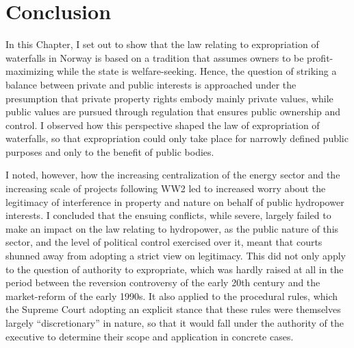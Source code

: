 
\section{Conclusion}\label{conc}

In this Chapter, I set out to show that the law relating to expropriation of waterfalls in Norway is based on a tradition that assumes owners to be profit-maximizing while the state is welfare-seeking. Hence, the question of striking a balance between private and public interests is approached under the presumption that private property rights embody mainly private values, while public values are pursued through regulation that ensures public ownership and control. I observed how this perspective shaped the law of expropriation of waterfalls, so that expropriation could only take place for narrowly defined public purposes and only to the benefit of public bodies.

I noted, however, how the increasing centralization of the energy sector and the increasing scale of projects following WW2 led to increased worry about the legitimacy of interference in property and nature on behalf of public hydropower interests. I concluded that the ensuing conflicts, while severe, largely failed to make an impact on the law relating to hydropower, as the public nature of this sector, and the level of political control exercised over it, meant that courts shunned away from adopting a strict view on legitimacy. This did not only apply to the question of authority to expropriate, which was hardly raised at all in the period between the reversion controversy of the early 20th century and the market-reform of the early 1990s.  It also applied to the procedural rules, which the Supreme Court adopting an explicit stance that these rules were themselves largely ``discretionary'' in nature, so that it would fall under the authority of the executive to determine their scope and application in concrete cases.

